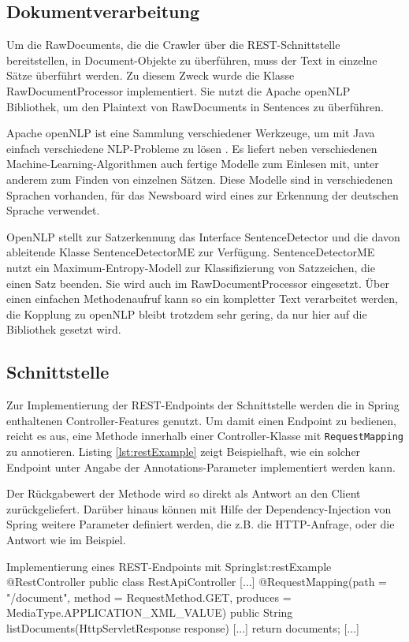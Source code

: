 \subsection{Dokumentverarbeitung}
Um die RawDocuments, die die Crawler über die REST-Schnittstelle bereitstellen,
in Document-Objekte zu überführen, muss der Text in einzelne Sätze überführt werden.
Zu diesem Zweck wurde die Klasse RawDocumentProcessor implementiert. Sie nutzt die
Apache openNLP Bibliothek, um den Plaintext von RawDocuments in Sentences zu überführen.

Apache openNLP ist eine Sammlung verschiedener Werkzeuge, um mit Java einfach verschiedene 
NLP-Probleme zu lösen \cite{opennlp}. Es liefert neben verschiedenen 
Machine-Learning-Algorithmen auch fertige Modelle zum Einlesen mit, unter anderem
zum Finden von einzelnen Sätzen. Diese Modelle sind in verschiedenen Sprachen vorhanden,
für das Newsboard wird eines zur Erkennung der deutschen Sprache verwendet.

OpenNLP stellt zur Satzerkennung das Interface SentenceDetector und die davon ableitende
Klasse SentenceDetectorME zur Verfügung. SentenceDetectorME nutzt ein Maximum-Entropy-Modell
zur Klassifizierung von Satzzeichen, die einen Satz beenden. Sie wird auch im
RawDocumentProcessor eingesetzt. Über einen einfachen Methodenaufruf kann so ein kompletter
Text verarbeitet werden, die Kopplung zu openNLP bleibt trotzdem sehr gering, da nur hier
auf die Bibliothek gesetzt wird.

\subsection{Schnittstelle}
Zur Implementierung der REST-Endpoints der Schnittstelle werden die in Spring enthaltenen
Controller-Features genutzt. Um damit einen Endpoint zu bedienen, reicht es aus,
eine Methode innerhalb einer Controller-Klasse mit \texttt{RequestMapping} zu annotieren.
Listing \ref{lst:restExample} zeigt Beispielhaft, wie ein solcher Endpoint unter Angabe der
Annotations-Parameter implementiert werden kann.

Der Rückgabewert der Methode wird so direkt als Antwort an den Client zurückgeliefert.
Darüber hinaus können mit Hilfe der Dependency-Injection von Spring weitere Parameter
definiert werden, die z.B. die HTTP-Anfrage, oder die Antwort wie im Beispiel.
\vspace{1em}

\begin{java}{Implementierung eines REST-Endpoints mit Spring}{lst:restExample}
@RestController
public class RestApiController {
	[...]
	@RequestMapping(path = "/document", method = RequestMethod.GET, produces = MediaType.APPLICATION_XML_VALUE)
	public String listDocuments(HttpServletResponse response) {
		[...]
		return documents;
	}
	[...]
}
\end{java}


